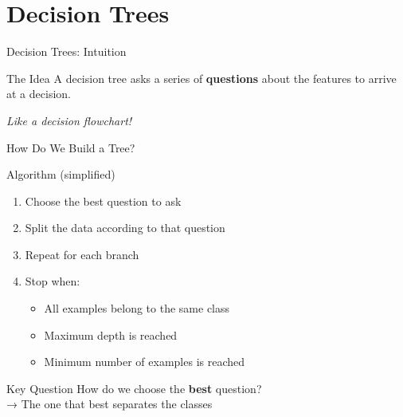 \documentclass[aspectratio=169]{beamer}
\begin{document}
\section{Decision Trees}

\begin{frame}{Decision Trees: Intuition}
\begin{block}{The Idea}
A decision tree asks a series of \textbf{questions} about the features to arrive at a decision.
\end{block}

\vspace{0.3cm}
\begin{center}
\end{center}

\vspace{0.3cm}
\textit{Like a decision flowchart!}
\end{frame}

\begin{frame}{How Do We Build a Tree?}
\begin{block}{Algorithm (simplified)}
\begin{enumerate}
    \item Choose the best question to ask
    \item Split the data according to that question
    \item Repeat for each branch
    \item Stop when:
    \begin{itemize}
        \item All examples belong to the same class
        \item Maximum depth is reached
        \item Minimum number of examples is reached
    \end{itemize}
\end{enumerate}
\end{block}

\vspace{0.3cm}
\begin{alertblock}{Key Question}
How do we choose the \textbf{best} question?\\
→ The one that best separates the classes
\end{alertblock}
\end{frame}
\end{document}
